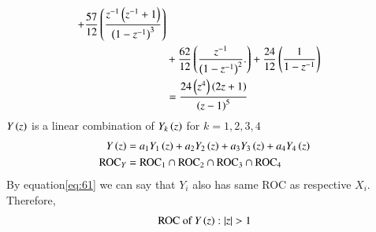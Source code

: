 \documentclass[journal,12pt,twocolumn]{IEEEtran}
\theoremstyle{remark}
\begin{document}
\begin{enumerate}[label=\arabic*.]
\begin{align}
         + \frac{57}{12}\left(\frac{z^{-1}\left(z^{-1}+1\right)}{\left(1-z^{-1}\right)^3}\right)\notag \\ &+ \frac{62}{12}\left(\frac{z^{-1}}{\left(1-z^{-1}\right)^2}.\right)+ \frac{24}{12}\left(\frac{1}{1 - z^{-1}} \right) \notag \\
         &= \frac{24 \left(z^4\right) \left(2z+1\right)}{\left(z-1\right)^5}
\end{align}
$Y\left(z\right)$ is a linear combination of $Y_k\left(z\right)$ for $k=1,2,3,4$
\begin{align}
    Y\left(z\right) &= a_1 Y_1\left(z\right) + a_2 Y_2\left(z\right) + a_3 Y_3\left(z\right) + a_4 Y_4\left(z\right) \label{eq:linear_combination_Y} \\
    \text{ROC}_{Y} &= \text{ROC}_{1} \cap \text{ROC}_{2} \cap \text{ROC}_{3} \cap \text{ROC}_{4} \label{eq:roc_Y}
\end{align}
By equation\eqref{eq:61} we can say that $Y_i$ also has same ROC as respective $X_i$. Therefore,\\
\begin{align}
    \text{ROC of $Y\brak{z}$} : |z|>1
\end{align}

\end{enumerate}
\end{document}

